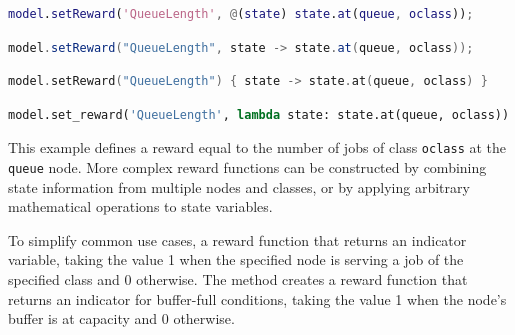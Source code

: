 \begin{MATLAB}
\begin{lstlisting}[language = matlab]
model.setReward('QueueLength', @(state) state.at(queue, oclass));
\end{lstlisting}
\end{MATLAB}
\begin{JAVA}
\begin{lstlisting}[language=java, basicstyle=\ttfamily\scriptsize]
model.setReward("QueueLength", state -> state.at(queue, oclass));
\end{lstlisting}
\end{JAVA}
\begin{KOTLIN}
\begin{lstlisting}[language=kotlin, basicstyle=\ttfamily\scriptsize]
model.setReward("QueueLength") { state -> state.at(queue, oclass) }
\end{lstlisting}
\end{KOTLIN}
\begin{PYTHON}
\begin{lstlisting}[language=python]
model.set_reward('QueueLength', lambda state: state.at(queue, oclass))
\end{lstlisting}
\end{PYTHON}

This example defines a reward equal to the number of jobs of class \texttt{oclass} at the \texttt{queue} node. More complex reward functions can be constructed by combining state information from multiple nodes and classes, or by applying arbitrary mathematical operations to state variables.

To simplify common use cases,  a reward function that returns an indicator variable, taking the value 1 when the specified node is serving a job of the specified class and 0 otherwise. The  method creates a reward function that returns an indicator for buffer-full conditions, taking the value 1 when the node's buffer is at capacity and 0 otherwise.

